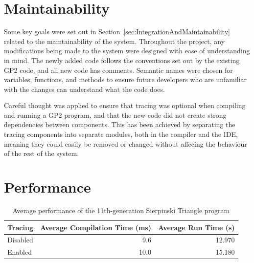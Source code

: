 \documentclass[authoryearcitations]{UoYCSproject}
\newenvironment{nscenter}
    {\parskip=0pt\par\nopagebreak\centering}
    {\par\noindent\ignorespacesafterend}
\begin{document}

\section{Maintainability}
\label{sec:MaintainabilityEval}

Some key goals were set out in Section~\ref{sec:IntegrationAndMaintainability}
related to the maintainability of the system. Throughout the project, any
modifications being made to the system were designed with ease of understanding
in mind. The newly added code follows the conventions set out by the existing
GP2 code, and all new code has comments. Semantic names were chosen for variables,
functions, and methods to ensure future developers who are unfamiliar with the
changes can understand what the code does.

Careful thought was applied to ensure that tracing was optional when compiling
and running a GP2 program, and that the new code did not create strong 
dependencies between components. This has been achieved by separating the
tracing components into separate modules, both in the compiler and the IDE,
meaning they could easily be removed or changed without affecing the behaviour of
the rest of the system.


\section{Performance}
\label{sec:Performance}

\begin{table}[!htb]
    \begin{nscenter}
        \begin{tabular}{|l|r|r|}
            \hline
            \textbf{Tracing} & \textbf{Average Compilation Time (ms)} & \textbf{Average Run Time (s)} \\ \hline
            Disabled         & 9.6                                    & 12.970                        \\ \hline
            Enabled          & 10.0                                   & 15.180                        \\ \hline
        \end{tabular}
        \caption{Average performance of the 11th-generation Sierpinski Triangle program}
        \label{tab:PerformanceTests}
    \end{nscenter}
\end{table}
\end{document}
